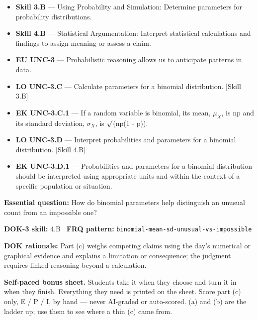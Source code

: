 \documentclass[11pt]{article}
\begin{document}


{\small
\begin{itemize}[leftmargin=1.5em,itemsep=2pt,topsep=2pt]
  \item \textbf{Skill 3.B} --- Using Probability and Simulation: Determine parameters for probability distributions.
  \item \textbf{Skill 4.B} --- Statistical Argumentation: Interpret statistical calculations and findings to assign meaning or assess a claim.
  \item \textbf{EU UNC-3} --- Probabilistic reasoning allows us to anticipate patterns in data.
  \item \textbf{LO UNC-3.C} --- Calculate parameters for a binomial distribution. [Skill 3.B]
  \item \textbf{EK UNC-3.C.1} --- If a random variable is binomial, its mean, $\mu_X$, is np and its standard deviation, $\sigma_X$, is $\surd$(np(1 - p)).
  \item \textbf{LO UNC-3.D} --- Interpret probabilities and parameters for a binomial distribution. [Skill 4.B]
  \item \textbf{EK UNC-3.D.1} --- Probabilities and parameters for a binomial distribution should be interpreted using appropriate units and within the context of a specific population or situation.
\end{itemize}
}
\textbf{Essential question:} How do binomial parameters help distinguish an unusual count from an impossible one?\par
\textbf{DOK-3 skill:} 4.B \textperiodcentered\ \textbf{FRQ pattern:} {\small\texttt{binomial-\allowbreak{}mean-\allowbreak{}sd-\allowbreak{}unusual-\allowbreak{}vs-\allowbreak{}impossible}}\par
\textbf{DOK rationale:} Part (c) weighs competing claims using the day's numerical or graphical evidence and explains a limitation or consequence; the judgment requires linked reasoning beyond a calculation.\par

\textbf{Self-paced bonus sheet.} Students take it when they choose and turn it in when they finish. Everything they need is printed on the sheet. Score part (c) only, E / P / I, by hand --- never AI-graded or auto-scored. (a) and (b) are the ladder up; use them to see where a thin (c) came from.\par
\end{document}
